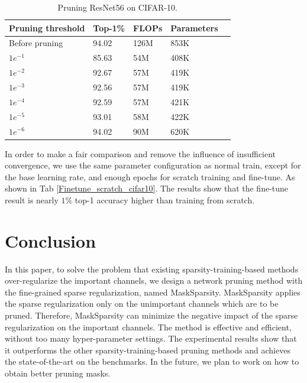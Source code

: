\documentclass[review]{cvpr}
\begin{document}
 
\begin{table}[ht]

	\caption{Pruning ResNet56 on CIFAR-10.}
	\small
	\setlength{\tabcolsep}{0.5em}
	\begin{center}
		\begin{tabular}{lllll}
			\toprule
			Pruning threshold               &Top-1\%           &FLOPs          &Parameters \\
			\midrule
			Before pruning & 94.02      &126M      &853K  \\
			$1e^{-1}$     & 85.63      &54M      &408K  \\
		    $1e^{-2}$     & 92.67      &57M      &419K  \\
		    $1e^{-3}$     & 92.56      &57M      &419K  \\
		    $1e^{-4}$     & 92.59      &57M      &421K  \\
		    $1e^{-5}$     & 93.01      &58M      &422K  \\
		    $1e^{-6}$     & 94.02      &90M      &620K  \\
			\bottomrule
			
		\end{tabular}
	\end{center} 
	\label{pruning_threshold}
\end{table}
 






In order to make a fair comparison and remove the influence of insufficient convergence, we use the same parameter configuration as normal train, except for the base learning rate, and enough epochs for scratch training and fine-tune. As shown in Tab \ref{Finetune_scratch_cifar10}. The results show that the fine-tune result is nearly  $1\%$ top-1 accuracy higher than training from scratch.
 


\section{Conclusion}\label{Conclusion}

In this paper, to solve the problem that existing sparsity-training-based methods over-regularize the important channels, we design a network pruning method with the fine-grained sparse regularization, named MaskSparsity. MaskSparsity applies the sparse regularization only on the unimportant channels which are to be pruned. Therefore, MaskSparsity can minimize the negative impact of the sparse regularization on the important channels. The method is effective and efficient, without too many hyper-parameter settings. The experimental results show that it outperforms the other sparsity-training-based pruning methods and achieves the state-of-the-art on the benchmarks. In the future, we plan to work on how to obtain better pruning masks.


{\small


}
\end{document}
